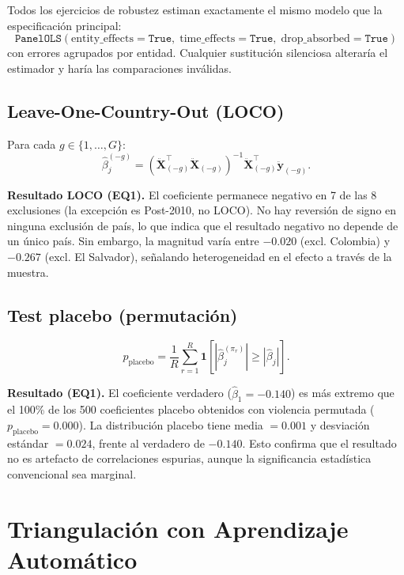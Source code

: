 \documentclass[12pt, a4paper]{article}
\theoremstyle{definition}
\newcommand{\abs}[1]{\left| #1 \right|}
\begin{document}
Todos los ejercicios de robustez estiman exactamente el mismo modelo que la especificación principal:
\[
  \texttt{PanelOLS}(\text{entity\_effects}=\texttt{True},\; \text{time\_effects}=\texttt{True},\; \text{drop\_absorbed}=\texttt{True})
\]
con errores agrupados por entidad. Cualquier sustitución silenciosa alteraría el estimador y haría las comparaciones inválidas.

\subsection{Leave-One-Country-Out (LOCO)}

Para cada $g \in \{1,\ldots,G\}$:
\[
  \hat\beta^{(-g)}_j = \left(\ddot{\bm{X}}_{(-g)}^\top\ddot{\bm{X}}_{(-g)}\right)^{-1}\ddot{\bm{X}}_{(-g)}^\top\ddot{\bm{y}}_{(-g)}.
\]

\begin{resultbox}
\textbf{Resultado LOCO (EQ1).} El coeficiente permanece negativo en 7 de las 8 exclusiones (la excepción es Post-2010, no LOCO). No hay reversión de signo en ninguna exclusión de país, lo que indica que el resultado negativo no depende de un único país. Sin embargo, la magnitud varía entre $-0.020$ (excl. Colombia) y $-0.267$ (excl. El Salvador), señalando heterogeneidad en el efecto a través de la muestra.
\end{resultbox}

\subsection{Test placebo (permutación)}

\[
  p_{\text{placebo}} = \frac{1}{R}\sum_{r=1}^{R}\mathbf{1}\!\left[\abs{\hat\beta^{(\pi_r)}_j} \geq \abs{\hat\beta_j}\right].
\]

\begin{resultbox}
\textbf{Resultado (EQ1).} El coeficiente verdadero ($\hat\beta_1 = -0.140$) es más extremo que el 100\% de los 500 coeficientes placebo obtenidos con violencia permutada ($p_{\text{placebo}} = 0.000$). La distribución placebo tiene media $= 0.001$ y desviación estándar $= 0.024$, frente al verdadero de $-0.140$. Esto confirma que el resultado no es artefacto de correlaciones espurias, aunque la significancia estadística convencional sea marginal.
\end{resultbox}

\section{Triangulación con Aprendizaje Automático}
\end{document}
